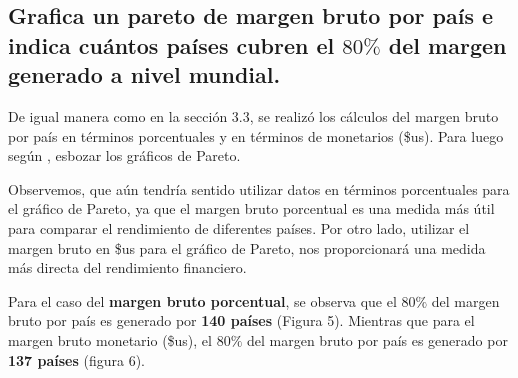 \documentclass[10pt]{article}
\begin{document}
\begin{paracol}{2}
\section{Grafica un pareto de margen bruto por país e indica cuántos países cubren el \boldmath $80\%$ del margen generado a nivel mundial.}
\switchcolumn[0]\noindent
De igual manera como en la sección 3.3, se realizó los cálculos del margen bruto por país en términos porcentuales y en términos de monetarios (\$us). Para luego según
\cite{grosfeld2007}, esbozar los gráficos de Pareto.

Observemos, que aún tendría sentido utilizar datos en términos porcentuales para el gráfico de Pareto, ya que el margen bruto porcentual es una medida más útil para comparar el rendimiento de diferentes países. Por otro lado, utilizar el margen bruto en \$us para el gráfico de Pareto, nos proporcionará una medida más directa del rendimiento financiero.

Para el caso del \textbf{margen bruto porcentual}, se observa que el $80\%$ del margen bruto por país es generado por \textbf{140 países} (Figura 5). Mientras que para el margen bruto monetario (\$us), el $80\%$ del margen bruto por país es generado por \textbf{137 países} (figura 6).



\end{paracol}
\end{document}
